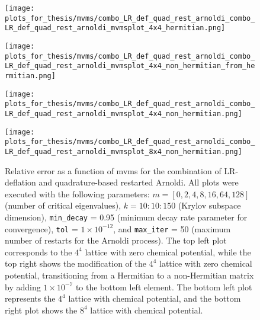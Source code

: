 \begin{figure}[H]
    \centering
    \begin{minipage}{0.45\textwidth}
        \centering
        \texttt{[image: plots\_for\_thesis/mvms/combo\_LR\_def\_quad\_rest\_arnoldi\_combo\_LR\_def\_quad\_rest\_arnoldi\_mvmsplot\_4x4\_hermitian.png]} %
    \end{minipage}%
    \hspace{0.02\textwidth} %
    \begin{minipage}{0.45\textwidth}
        \centering
        \texttt{[image: plots\_for\_thesis/mvms/combo\_LR\_def\_quad\_rest\_arnoldi\_combo\_LR\_def\_quad\_rest\_arnoldi\_mvmsplot\_4x4\_non\_hermitian\_from\_hermitian.png]} %
    \end{minipage}
    
    \vspace{0.02\textwidth} %
    
    \begin{minipage}{0.45\textwidth}
        \centering
        \texttt{[image: plots\_for\_thesis/mvms/combo\_LR\_def\_quad\_rest\_arnoldi\_combo\_LR\_def\_quad\_rest\_arnoldi\_mvmsplot\_4x4\_non\_hermitian.png]} %
    \end{minipage}%
    \hspace{0.02\textwidth} %
    \begin{minipage}{0.45\textwidth}
        \centering
        \texttt{[image: plots\_for\_thesis/mvms/combo\_LR\_def\_quad\_rest\_arnoldi\_combo\_LR\_def\_quad\_rest\_arnoldi\_mvmsplot\_8x4\_non\_hermitian.png]} %
    \end{minipage}
    
    \caption{\small Relative error as a function of mvms for the combination of LR-deflation and quadrature-based restarted Arnoldi. All plots were executed with the following parameters: $m = [0, 2, 4, 8, 16, 64, 128]$ (number of critical eigenvalues), $k = 10:10:150$ (Krylov subspace dimension), \texttt{min\_decay} = 0.95 (minimum decay rate parameter for convergence), \texttt{tol} = $1 \times 10^{-12}$, and \texttt{max\_iter} = 50 (maximum number of restarts for the Arnoldi process). The top left plot corresponds to the $4^4$ lattice with zero chemical potential, while the top right shows the modification of the $4^4$ lattice with zero chemical potential, transitioning from a Hermitian to a non-Hermitian matrix by adding $1 \times 10^{-7}$ to the bottom left element. The bottom left plot represents the $4^4$ lattice with chemical potential, and the bottom right plot shows the $8^4$ lattice with chemical potential.}
    \label{fig:combo_LR+restarted_arnoldi_mvms_plot}
\end{figure}

